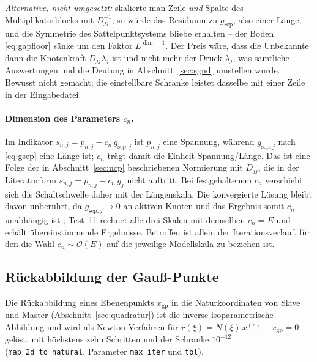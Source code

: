 \documentclass[a4paper,11pt]{article}
\def\bm#1{#1}%
\def\tilde#1{#1}%
\newcommand{\code}[1]{\texttt{\small #1}}
\begin{document}
\medskip
\noindent\emph{Alternative, nicht umgesetzt:} skalierte man Zeile \emph{und} Spalte des
Multiplikatorblocks mit $\tilde D_{jj}^{-1}$, so würde das Residuum zu $g_{\text{sep}}$, also einer
Länge, und die Symmetrie des Sattelpunktsystems bliebe erhalten -- der Boden \eqref{eq:gapfloor}
sänke um den Faktor $L^{\dim-1}$. Der Preis wäre, dass die Unbekannte dann die Knotenkraft
$\tilde D_{jj}\lambda_j$ ist und nicht mehr der Druck $\lambda_j$, was sämtliche Auswertungen und
die Deutung in Abschnitt~\ref{sec:sgnd} umstellen würde. Bewusst nicht gemacht; die einstellbare
Schranke leistet dasselbe mit einer Zeile in der Eingabedatei.

\paragraph{Dimension des Parameters $c_n$.}
Im Indikator $s_{n,j}=p_{n,j}-c_n\,g_{\text{sep},j}$ ist $p_{n,j}$ eine Spannung, während
$g_{\text{sep},j}$ nach \eqref{eq:gsep} eine Länge ist; $c_n$ trägt damit die Einheit
Spannung/Länge. Das ist eine Folge der in Abschnitt~\ref{sec:ncp} beschriebenen Normierung mit
$\tilde D_{jj}$, die in der Literaturform $s_{n,j}=p_{n,j}-c_n\,\tilde g_j$ nicht auftritt. Bei
festgehaltenem $c_n$ verschiebt sich die Schaltschwelle daher mit der Längenskala. Die konvergierte
Lösung bleibt davon unberührt, da $g_{\text{sep},j}\to0$ an aktiven Knoten und das Ergebnis somit
$c_n$-unabhängig ist \citep[Abschn.~3.5.2]{farah}; Test~11 rechnet alle drei Skalen mit demselben
$c_n=E$ und erhält übereinstimmende Ergebnisse. Betroffen ist allein der Iterationsverlauf, für
den die Wahl $c_n\sim\mathcal O(E)$ auf die jeweilige Modellskala zu beziehen ist.

\subsection{Rückabbildung der Gauß-Punkte}
\label{sec:rueckabbildung}
Die Rückabbildung eines Ebenenpunkts $\bm x_{\text{gp}}$ in die Naturkoordinaten von Slave und
Master (Abschnitt~\ref{sec:quadratur}) ist die inverse isoparametrische Abbildung und wird als
Newton-Verfahren für $\bm r(\bm\xi)=\bm N(\bm\xi)\,\bm x^{(e)}-\bm x_{\text{gp}}=\bm 0$ gelöst,
mit höchstens zehn Schritten und der Schranke $10^{-12}$ (\code{map\_2d\_to\_natural}, Parameter
\code{max\_iter} und \code{tol}).
\end{document}
